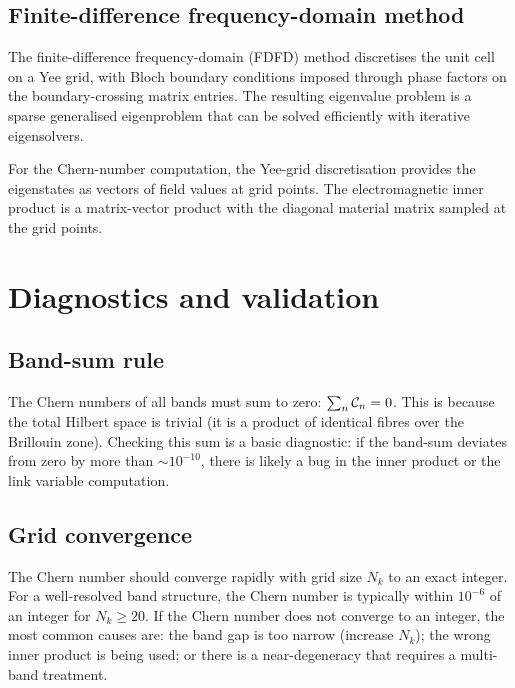 \subsection{Finite-difference frequency-domain method}
\label{sec:ch10-fdfd}

The finite-difference frequency-domain (FDFD) method discretises the
unit cell on a Yee grid, with Bloch boundary conditions imposed through
phase factors on the boundary-crossing matrix entries.  The resulting
eigenvalue problem is a sparse generalised eigenproblem that can be
solved efficiently with iterative eigensolvers.

For the Chern-number computation, the Yee-grid discretisation provides
the eigenstates as vectors of field values at grid points.  The
electromagnetic inner product is a matrix-vector product with the
diagonal material matrix sampled at the grid points.

\section{Diagnostics and validation}
\label{sec:ch10-diagnostics}

\subsection{Band-sum rule}
\label{sec:ch10-band-sum}

The Chern numbers of all bands must sum to zero:
$\sum_n\mathcal{C}_n=0$.  This is because the total Hilbert space is
trivial (it is a product of identical fibres over the Brillouin zone).
Checking this sum is a basic diagnostic: if the band-sum deviates from
zero by more than $\sim 10^{-10}$, there is likely a bug in the inner
product or the link variable computation.

\subsection{Grid convergence}
\label{sec:ch10-grid-convergence}

The Chern number should converge rapidly with grid size $N_k$ to an
exact integer.  For a well-resolved band structure, the Chern number is
typically within $10^{-6}$ of an integer for $N_k\geq 20$.  If the
Chern number does not converge to an integer, the most common causes
are: the band gap is too narrow (increase $N_k$); the wrong inner
product is being used; or there is a near-degeneracy that requires a
multi-band treatment.

